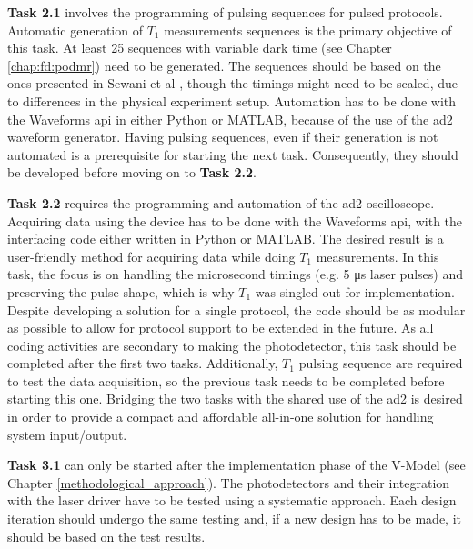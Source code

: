 \textbf{Task 2.1} involves the programming of pulsing sequences for pulsed protocols. Automatic generation of $T_1$ measurements sequences is the primary objective of this task. At least 25 sequences with variable dark time (see Chapter \ref{chap:fd:podmr}) need to be generated. The sequences should be based on the ones presented in Sewani et al \cite{sewani2020coherent}, though the timings might need to be scaled, due to differences in the physical experiment setup. Automation has to be done with the Waveforms \gls{api} in either Python or MATLAB, because of the use of the \gls{ad2} waveform generator. Having pulsing sequences, even if their generation is not automated is a prerequisite for starting the next task. Consequently, they should be developed before moving on to \textbf{Task 2.2}. 

\textbf{Task 2.2} requires the programming and automation of the \gls{ad2} oscilloscope. Acquiring data using the device has to be done with the Waveforms \gls{api}, with the interfacing code either written in Python or MATLAB. The desired result is a user-friendly method for acquiring data while doing $T_1$ measurements. In this task, the focus is on handling the microsecond timings (e.g. 5 \unit{\micro\second} laser pulses) and preserving the pulse shape, which is why $T_1$ was singled out for implementation. Despite developing a solution for a single protocol, the code should be as modular as possible to allow for protocol support to be extended in the future. As all coding activities are secondary to making the photodetector, this task should be completed after the first two tasks. Additionally, $T_1$ pulsing sequence are required to test the data acquisition, so the previous task needs to be completed before starting this one. Bridging the two tasks with the shared use of the \gls{ad2} is desired in order to provide a compact and affordable all-in-one solution for handling system input/output.

\textbf{Task 3.1} can only be started after the implementation phase of the V-Model (see Chapter \ref{methodological_approach}). The photodetectors and their integration with the laser driver have to be tested using a systematic approach. Each design iteration should undergo the same testing and, if a new design has to be made, it should be based on the test results. 

